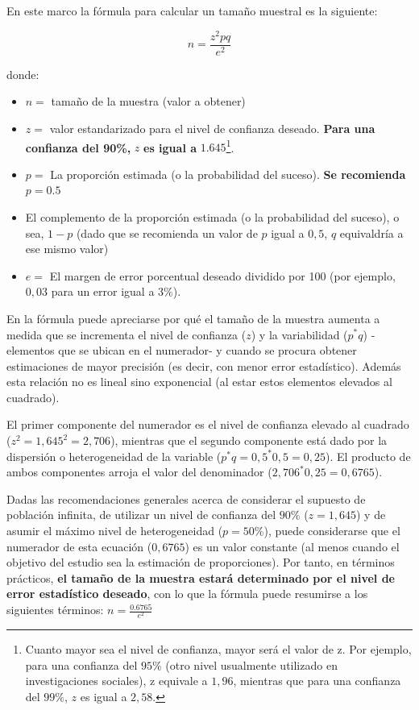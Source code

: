 \documentclass[
]{book}
\begin{document}
En este marco la fórmula para calcular un tamaño muestral es la siguiente:

\[n = \frac{z^2pq}{e^2}\]

donde:

\begin{itemize}
\item
  \(n =\) tamaño de la muestra (valor a obtener)
\item
  \(z =\) valor estandarizado para el nivel de confianza deseado. \textbf{Para una confianza del 90\%,} \(z\) \textbf{es igual a} \(1.645\)\footnote{Cuanto mayor sea el nivel de confianza, mayor será el valor de z. Por ejemplo, para una confianza del \(95\%\) (otro nivel usualmente utilizado en investigaciones sociales), z equivale a \(1,96\), mientras que para una confianza del \(99\%\), \(z\) es igual a \(2,58\).}.
\end{itemize}

\begin{itemize}
\item
  \(p =\) La proporción estimada (o la probabilidad del suceso). \textbf{Se recomienda} \(p = 0.5\)
\item
  El complemento de la proporción estimada (o la probabilidad del suceso), o sea, \(1 - p\) (dado que se recomienda un valor de \(p\) igual a \(0,5\), \(q\) equivaldría a ese mismo valor)
\item
  \(e =\) El margen de error porcentual deseado dividido por 100 (por ejemplo, \(0,03\) para un error igual a \(3\%\)).
\end{itemize}

En la fórmula puede apreciarse por qué el tamaño de la muestra aumenta a medida que se incrementa el nivel de confianza (\(z\)) y la variabilidad (\(p^*q\)) - elementos que se ubican en el numerador- y cuando se procura obtener estimaciones de mayor precisión (es decir, con menor error estadístico). Además esta relación no es lineal sino exponencial (al estar estos elementos elevados al cuadrado).

El primer componente del numerador es el nivel de confianza elevado al cuadrado (\(z^2=1,645^2=2,706\)), mientras que el segundo componente está dado por la dispersión o heterogeneidad de la variable (\(p^*q=0,5^*0,5=0,25\)). El producto de ambos componentes arroja el valor del denominador (\(2,706^*0,25=0,6765\)).

Dadas las recomendaciones generales acerca de considerar el supuesto de población infinita, de utilizar un nivel de confianza del \(90\%\) (\(z=1,645\)) y de asumir el máximo nivel de heterogeneidad (\(p=50\%\)), puede considerarse que el numerador de esta ecuación (\(0,6765\)) es un valor constante (al menos cuando el objetivo del estudio sea la estimación de proporciones). Por tanto, en términos prácticos, \textbf{el tamaño de la muestra estará determinado por el nivel de error estadístico deseado}, con lo que la fórmula puede resumirse a los siguientes términos: \(n = \frac{0.6765}{e^2}\)
\end{document}
